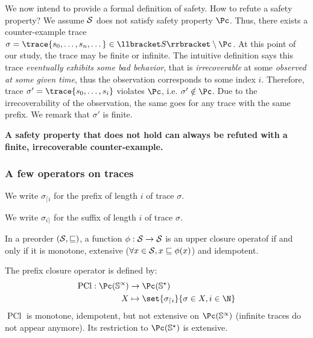 \documentclass[toc, titlepaged]{../cs-classes/cs-classes}
\DeclareMathOperator{\pcl}{PCl}
\begin{document}
We now intend to provide a formal definition of safety. How to refute a safety property? We assume $\mathcal{S}$ does not satisfy safety property $\Pc$. Thus, there exists a counter-example trace $\sigma=\trace{s_0, \dots, s_n, \dots}\in \llbracket S \rrbracket \setminus \Pc$. At this point of our study, the trace may be finite or infinite. The intuitive definition says this trace \emph{eventually exhibits some bad behavior}, that is \emph{irrecoverable} at some \emph{observed at some given time}, thus the observation corresponds to some index $i$. Therefore, trace $\sigma' = \trace{s_0, \dots, s_i}$ violates $\Pc$, i.e. $\sigma'\notin\Pc$. Due to the irrecoverability of the observation, the same goes for any trace with the same prefix. We remark that $\sigma'$ is finite.
\begin{center}
    \bf A safety property that does not hold can always be refuted with a finite, irrecoverable counter-example.
\end{center}

\subsubsection{A few operators on traces}
\begin{definition}[Prefix]
    We write $\sigma_{\lceil i}$ for the prefix of length $i$ of trace $\sigma$.
\end{definition}

\begin{definition}
    We write $\sigma_{i \rceil}$ for the suffix of length $i$ of trace $\sigma$.
\end{definition}

\begin{definition}[Upper closure operators ($\pcl$)]
    In a preorder $(\mathcal{S}, \sqsubseteq)$, a function $\phi : \mathcal{S} \to \mathcal{S}$ is an upper closure operatof if and only if it is monotone, extensive ($\forall x\in \mathcal{S}, x\sqsubseteq \phi(x)$) and idempotent.
\end{definition}

\begin{definition}
    The prefix closure operator is defined by:
    \begin{equation*}
        \begin{aligned}
            \pcl : \Pc(\S^\propto) &\to \Pc(\S^\star)\\
            X &\mapsto \set{\sigma_{\lceil i}}{\sigma\in X, i\in \N}
        \end{aligned}
    \end{equation*}
    $\pcl$ is monotone, idempotent, but not extensive on $\Pc(\S^\propto)$ (infinite traces do not appear anymore). Its restriction to $\Pc(\S^\star)$ is extensive.
\end{definition}
\end{document}
